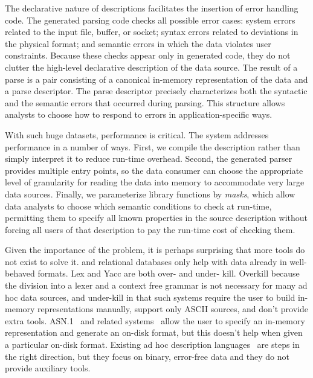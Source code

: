 The declarative nature of \pads{} descriptions facilitates the
insertion of error handling code.
The generated parsing code checks all possible error cases: system
errors related to the input file, buffer, or socket; syntax errors
related to deviations in the physical format; and semantic errors in
which the data violates user constraints.  Because these checks appear
only in generated code, they do not clutter the high-level declarative
description of the data source.
The result of a parse is a pair consisting of a canonical in-memory
representation of the data and a parse descriptor. The parse
descriptor precisely characterizes both the syntactic and the semantic
errors that occurred during parsing.  This structure allows analysts
to choose how to respond to errors in application-specific ways.  

With such huge datasets, performance is critical. The \pads{} system
addresses performance in a number of ways.  First, we compile the
\pads{} description rather than simply interpret it to reduce run-time
overhead.  Second, the generated parser provides multiple entry
points, so the data consumer can choose the appropriate level of
granularity for reading the data into memory to accommodate very large
data sources.  Finally, we parameterize library functions by
\textit{masks}, which allow data analysts to choose which semantic
conditions to check at run-time, permitting them to specify all known
properties in the source description without forcing all users of that
description to pay the run-time cost of checking them.

Given the importance of the problem, it is perhaps surprising that
more tools do not exist to solve it.  \xml{} and relational databases
only help with data already in well-behaved formats.  Lex and Yacc are
both over- and under- kill.  Overkill because the division into a
lexer and a context free grammar is not necessary for many ad hoc data
sources, and under-kill in that such systems require the user to build
in-memory representations manually, support only ASCII sources, and
don't provide extra tools.  ASN.1~\cite{asn} and related
systems~\cite{asdl} allow the user to specify an in-memory
representation and generate an on-disk format, but this doesn't help
when given a particular on-disk format.  Existing ad hoc description
languages~\cite{gpce02,sigcomm00,erlang} are steps in the right
direction, but they focus on binary, error-free data and they do not
provide auxiliary tools.



